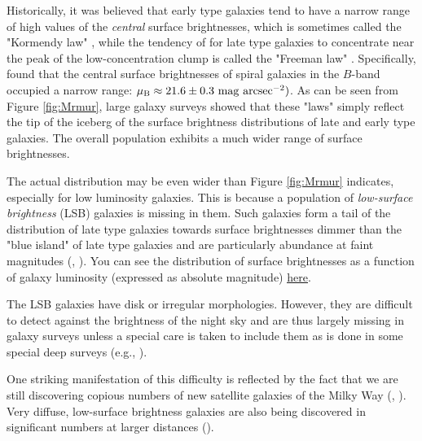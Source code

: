 Historically, it was believed that early type galaxies tend to have a narrow range of high values of the {\it central\/} surface brightnesses, which is sometimes called the "Kormendy law" \href{http://adsabs.harvard.edu/cgi-bin/bib_query?1977ApJ...218..333K}{\citep{kormendy77}}, while the tendency of for late type galaxies to concentrate near the peak of the low-concentration clump is called the "Freeman law" \href{http://adsabs.harvard.edu/cgi-bin/bib_query?1970ApJ...160..811F}{\citep{freeman70}}. Specifically,  \href{http://adsabs.harvard.edu/cgi-bin/bib_query?1970ApJ...160..811F}{\citet{freeman70}} found that the central surface brightnesses of spiral galaxies in the $B$-band occupied a narrow range: $\mu_{\rm B}\approx 21.6\pm 0.3\ \mathrm{mag\ arcsec^{-2}})$. As can be seen from Figure \ref{fig:Mrmur}, large galaxy surveys showed that these "laws" simply reflect the tip of the iceberg of the surface brightness distributions of late and early type galaxies. The overall population exhibits a much wider range of surface brightnesses. 

The actual distribution may be even wider than Figure \ref{fig:Mrmur} indicates, especially for low luminosity galaxies. This is because a population of {\it low-surface brightness} (LSB) galaxies is missing in them. Such galaxies form a tail of the distribution of late type galaxies towards surface brightnesses dimmer than the "blue island" of late type galaxies and are particularly abundance at faint magnitudes (\href{http://adsabs.harvard.edu/abs/1997PASP..109..745B}{\citealt{bothun_etal97}}, \href{http://adsabs.harvard.edu/abs/2004PASA...21..344D}{\citealt{driver04}}). You can see the distribution of surface brightnesses as a function of galaxy luminosity (expressed as absolute magnitude) \href{http://ned.ipac.caltech.edu/level5/Sept04/Driver/Figures/figure2.jpg}{\underline{here}}.

The LSB galaxies have disk or irregular morphologies. However, they are difficult to detect against the brightness of the night sky and are thus largely missing in galaxy surveys unless a special care is taken to include them as is done in some special deep surveys (e.g., \href{http://adsabs.harvard.edu/abs/2005MNRAS.360...81D}{\citealt{driver_etal05}}). 

One striking manifestation of this difficulty is reflected by the fact that we are still discovering copious numbers of new satellite galaxies of the Milky Way (\href{http://adsabs.harvard.edu/abs/2015ApJ...805..130K}{\citealt{koposov_etal15}}, \href{http://adsabs.harvard.edu/abs/2015ApJ...813..109D}{\citealt{drlica_wagner_etal15}}). Very diffuse, low-surface brightness galaxies are also being discovered in significant numbers at larger distances (\href{http://adsabs.harvard.edu/abs/2015ApJ...798L..45V}{\citealt{vandokkum_etal15}}).

